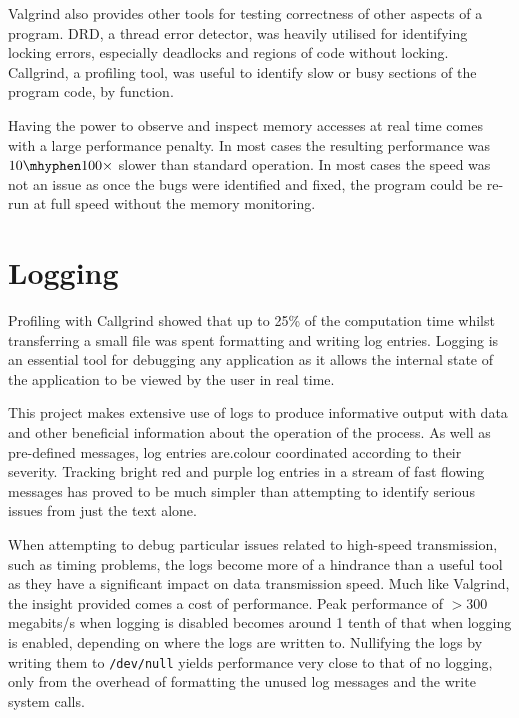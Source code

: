     Valgrind also provides other tools for testing correctness of other aspects of a program. DRD, a thread error detector, was heavily utilised for identifying locking errors, especially deadlocks and regions of code without locking. Callgrind, a profiling tool, was useful to identify slow or busy sections of the program code, by function.

    Having the power to observe and inspect memory accesses at real time comes with a large performance penalty. In most cases the resulting performance was $10 \mhyphen 100 \times$ slower than standard operation. In most cases the speed was not an issue as once the bugs were identified and fixed, the program could be re-run at full speed without the memory monitoring.

    \section{Logging}\label{sec:logging}
    Profiling with Callgrind showed that up to 25\% of the computation time whilst transferring a small file was spent formatting and writing log entries. Logging is an essential tool for debugging any application as it allows the internal state of the application to be viewed by the user in real time.

    This project makes extensive use of logs to produce informative output with data and other beneficial information about the operation of the process. As well as pre-defined messages, log entries are.colour coordinated according to their severity. Tracking bright red and purple log entries in a stream of fast flowing messages has proved to be much simpler than attempting to identify serious issues from just the text alone.

    When attempting to debug particular issues related to high-speed transmission, such as timing problems, the logs become more of a hindrance than a useful tool as they have a significant impact on data transmission speed. Much like Valgrind, the insight provided comes a cost of performance. Peak performance of $> 300$ megabits/s when logging is disabled becomes around 1 tenth of that when logging is enabled, depending on where the logs are written to. Nullifying the logs by writing them to \texttt{/dev/null} yields performance very close to that of no logging, only from the overhead of formatting the unused log messages and the write system calls.

